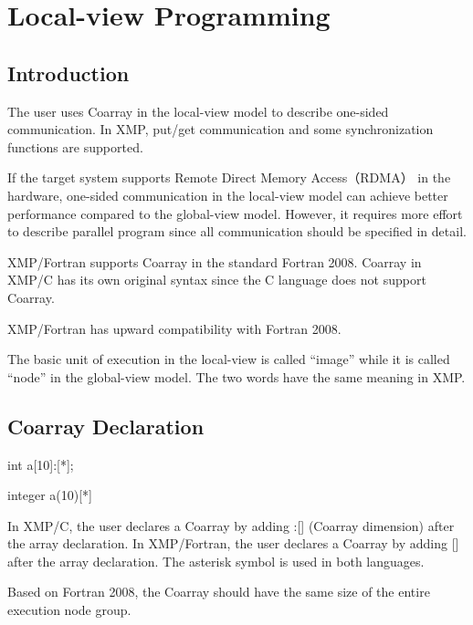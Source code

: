 \section{Local-view Programming}

\subsection{Introduction}

The user uses Coarray in the local-view model to describe one-sided
communication. In XMP, put/get communication and some synchronization
functions are supported.

If the target system supports Remote Direct Memory Access（RDMA） in the
hardware, one-sided communication in the local-view model can achieve
better performance compared to the global-view model. However, it
requires more effort to describe parallel program since all
communication should be specified in detail.

XMP/Fortran supports Coarray in the standard Fortran 2008. Coarray in
XMP/C has its own original syntax since the C language does not support
Coarray.

\begin{mynote}
  XMP/Fortran has upward compatibility with Fortran 2008.
\end{mynote}

The basic unit of execution in the local-view is called “image” while it
is called “node” in the global-view model. The two words have the same
meaning in XMP.

\subsection{Coarray Declaration}

\begin{XCexample}
int a[10]:[*];
\end{XCexample}

\begin{XFexample}
integer a(10)[*]
\end{XFexample}

In XMP/C, the user declares a Coarray by adding :[] (Coarray dimension)
after the array declaration. In XMP/Fortran, the user declares a Coarray
by adding [] after the array declaration. The asterisk symbol is used in
both languages.

\begin{mynote}
Based on Fortran 2008, the Coarray should have the same size of the
entire execution node group.
\end{mynote}

